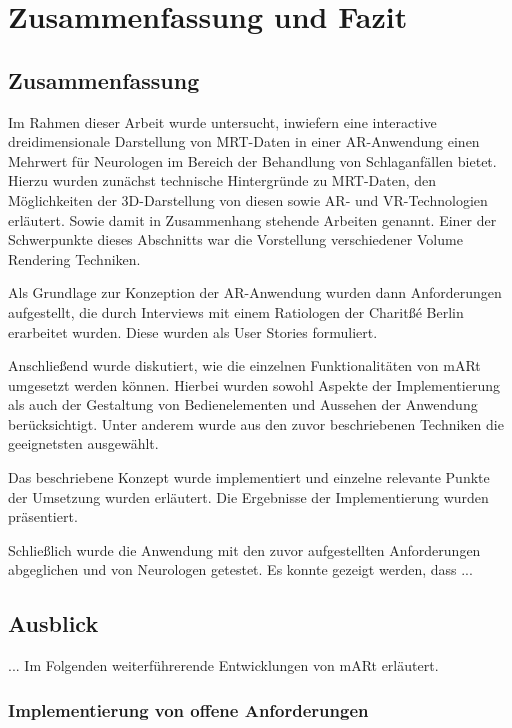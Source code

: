 
\chapter{Zusammenfassung und Fazit}

\section{Zusammenfassung}

Im Rahmen dieser Arbeit wurde untersucht, inwiefern eine interactive dreidimensionale Darstellung von MRT-Daten in einer AR-Anwendung einen Mehrwert für Neurologen im Bereich der Behandlung von Schlaganfällen bietet. 
Hierzu wurden zunächst technische Hintergründe zu MRT-Daten, den Möglichkeiten der 3D-Darstellung von diesen sowie AR- und VR-Technologien erläutert. Sowie damit in Zusammenhang stehende Arbeiten genannt. Einer der Schwerpunkte dieses Abschnitts war die Vorstellung verschiedener Volume Rendering Techniken.

Als Grundlage zur Konzeption der AR-Anwendung wurden dann Anforderungen aufgestellt, die durch Interviews mit einem Ratiologen der Charitßé Berlin erarbeitet wurden. Diese wurden als User Stories formuliert.

Anschließend wurde diskutiert, wie die einzelnen Funktionalitäten von mARt umgesetzt werden können. Hierbei wurden sowohl Aspekte der Implementierung als auch der Gestaltung von Bedienelementen und Aussehen der Anwendung berücksichtigt. Unter anderem wurde aus den zuvor beschriebenen Techniken die geeignetsten ausgewählt. 

Das beschriebene Konzept wurde implementiert und einzelne relevante Punkte der Umsetzung wurden erläutert. Die Ergebnisse der Implementierung wurden präsentiert.

Schließlich wurde die Anwendung mit den zuvor aufgestellten Anforderungen abgeglichen und von Neurologen getestet. 
Es konnte gezeigt werden, dass ...

\section{Ausblick}

...
Im Folgenden weiterführerende Entwicklungen von mARt erläutert.

\subsection{Implementierung von offene  Anforderungen}

